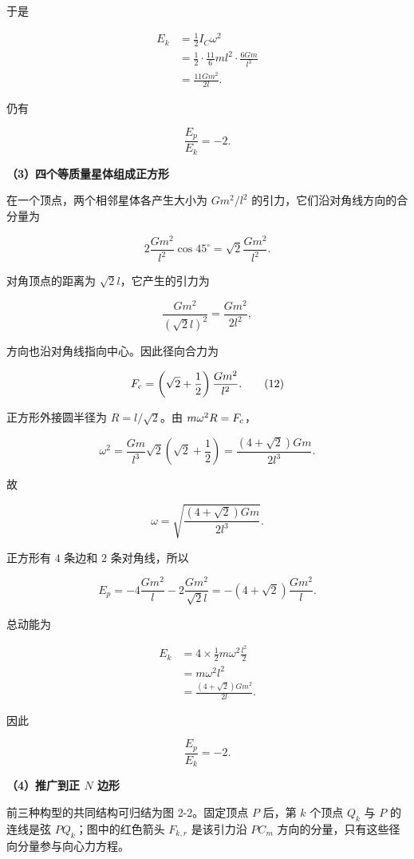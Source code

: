 \documentclass[12pt,a4paper,UTF8]{ctexart}
\begin{document}
于是

\[
\begin{aligned}
E_k
&=\frac12I_C\omega^2\\
&=\frac12\cdot\frac{11}{6}ml^2\cdot\frac{6Gm}{l^3}\\
&=\frac{11Gm^2}{2l}.
\end{aligned}
\tag{10}
\]

仍有

\[
\boxed{\frac{E_p}{E_k}=-2}.
\tag{11}
\]

\textbf{（3）四个等质量星体组成正方形}

在一个顶点，两个相邻星体各产生大小为 \(Gm^2/l^2\)
的引力，它们沿对角线方向的合分量为

\[
2\frac{Gm^2}{l^2}\cos45^\circ
=\sqrt2\frac{Gm^2}{l^2}.
\]

对角顶点的距离为 \(\sqrt2l\)，它产生的引力为

\[
\frac{Gm^2}{(\sqrt2l)^2}
=\frac{Gm^2}{2l^2},
\]

方向也沿对角线指向中心。因此径向合力为

\[
F_{\rm c}=\left(\sqrt2+\frac12\right)\frac{Gm^2}{l^2}.
\tag{12}
\]

正方形外接圆半径为 \(R=l/\sqrt2\)。由 \(m\omega^2R=F_{\rm c}\)，

\[
\omega^2
=\frac{Gm}{l^3}\sqrt2\left(\sqrt2+\frac12\right)
=\frac{(4+\sqrt2)Gm}{2l^3}.
\]

故

\[
\boxed{\omega=\sqrt{\frac{(4+\sqrt2)Gm}{2l^3}}}.
\tag{13}
\]

正方形有 \(4\) 条边和 \(2\) 条对角线，所以

\[
E_p
=-4\frac{Gm^2}{l}-2\frac{Gm^2}{\sqrt2l}
=-(4+\sqrt2)\frac{Gm^2}{l}.
\tag{14}
\]

总动能为

\[
\begin{aligned}
E_k
&=4\times\frac12m\omega^2\frac{l^2}{2}\\
&=m\omega^2l^2\\
&=\frac{(4+\sqrt2)Gm^2}{2l}.
\end{aligned}
\tag{15}
\]

因此

\[
\boxed{\frac{E_p}{E_k}=-2}.
\tag{16}
\]

\textbf{（4）推广到正 \(N\) 边形}

前三种构型的共同结构可归结为图 2-2。固定顶点 \(P\) 后，第 \(k\) 个顶点
\(Q_k\) 与 \(P\) 的连线是弦 \(PQ_k\)；图中的红色箭头 \(F_{k,r}\)
是该引力沿 \(PC_m\) 方向的分量，只有这些径向分量参与向心力方程。
\end{document}
